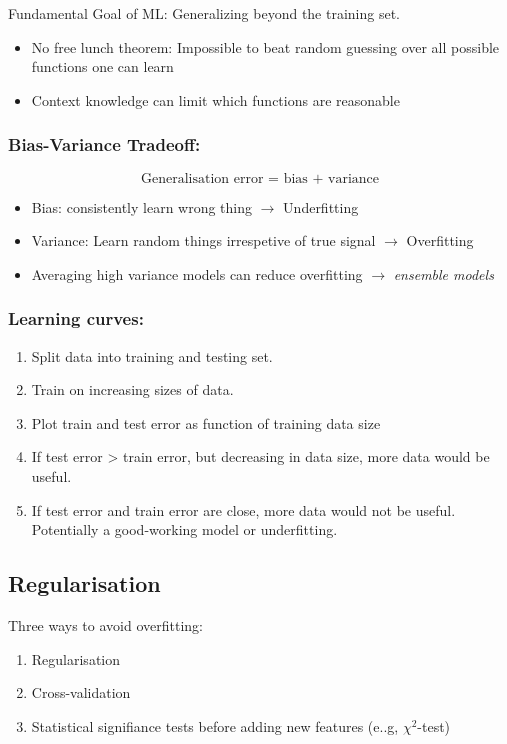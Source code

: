 \documentclass[11pt, %
	oneside, %
	english, %
	onehalfspacing, %
	parskip, %
	]{article} %
\theoremstyle{definition}
\begin{document}
Fundamental Goal of ML: Generalizing beyond the training set.

\begin{itemize}
	\item No free lunch theorem: Impossible to beat random guessing over all possible functions one can learn
	\item Context knowledge can limit which functions are reasonable
\end{itemize}

\subsubsection*{Bias-Variance Tradeoff:}
\begin{equation*}
	\text{Generalisation error = bias + variance}
\end{equation*}
\begin{itemize}
	\item Bias: consistently learn wrong thing $\to$ Underfitting
	\item Variance: Learn random things irrespetive of true signal $\to$ Overfitting
	\item Averaging high variance models can reduce overfitting $\to$ \emph{ensemble models}
\end{itemize}

\subsubsection*{Learning curves:}
\begin{enumerate}
	\item Split data into training and testing set.
	\item Train on increasing sizes of data. \item Plot train and test error as function of training data size
	\item If test error > train error, but decreasing in data size, more data would be useful.
	\item If test error and train error are close, more data would not be useful. Potentially a good-working model or underfitting.
\end{enumerate}

\subsection{Regularisation}

Three ways to avoid overfitting:
\begin{enumerate}
	\item Regularisation
	\item Cross-validation
	\item Statistical signifiance tests before adding new features (e..g, $\chi^2$-test)
\end{enumerate}
\end{document}
